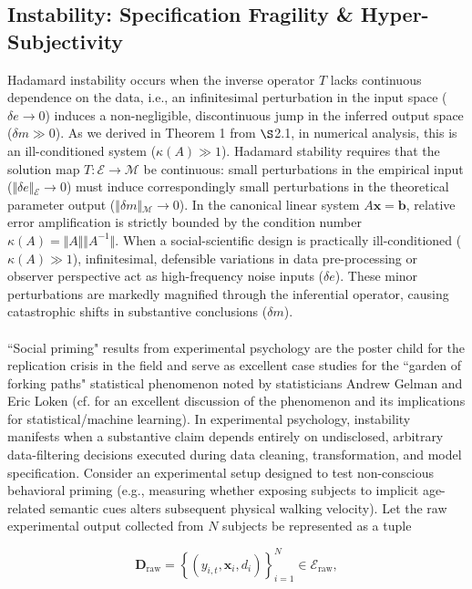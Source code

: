\documentclass{article}
\theoremstyle{definition}
\begin{document}
\subsection{Instability: Specification Fragility \& Hyper-Subjectivity}

Hadamard instability occurs when the inverse operator $T$ lacks continuous dependence on the data, i.e., an infinitesimal perturbation in the input space ($\delta e \to 0$) induces a non-negligible, discontinuous jump in the inferred output space ($\delta m \gg 0$). As we derived in Theorem 1 from $\S$2.1, in numerical analysis, this is an ill-conditioned system ($\kappa(A) \gg 1$). Hadamard stability requires that the solution map $T: \mathcal{E} \to \mathcal{M}$ be continuous: small perturbations in the empirical input ($\Vert{}\delta e\Vert{}_\mathcal{E} \to 0$) must induce correspondingly small perturbations in the theoretical parameter output ($\Vert{}\delta m\Vert{}_\mathcal{M} \to 0$). In the canonical linear system $A\mathbf{x} = \mathbf{b}$, relative error amplification is strictly bounded by the condition number $\kappa(A) = \Vert{}A\Vert{} \Vert{}A^{-1}\Vert{}$. When a social-scientific design is practically ill-conditioned ($\kappa(A) \gg 1$), infinitesimal, defensible variations in data pre-processing or observer perspective act as high-frequency noise inputs ($\delta e$). These minor perturbations are markedly magnified through the inferential operator, causing catastrophic shifts in substantive conclusions ($\delta m$). \\
\\
``Social priming" results from experimental psychology are the poster child for the replication crisis in the field \cite{SR21} and serve as excellent case studies for the ``garden of forking paths" statistical phenomenon noted by statisticians Andrew Gelman and Eric Loken (cf. \cite{KR19} for an excellent discussion of the phenomenon and its implications for statistical/machine learning). In experimental psychology, instability manifests when a substantive claim depends entirely on undisclosed, arbitrary data-filtering decisions executed during data cleaning, transformation, and model specification. Consider an experimental setup designed to test non-conscious behavioral priming (e.g., measuring whether exposing subjects to implicit age-related semantic cues alters subsequent physical walking velocity). Let the raw experimental output collected from $N$ subjects be represented as a tuple

\begin{equation}
\mathbf{D}_{\text{raw}} = \left\{ (y_{i,t}, \mathbf{x}_i, d_i) \right\}_{i=1}^N \in \mathcal{E}_{\text{raw}},
\end{equation}
\end{document}

